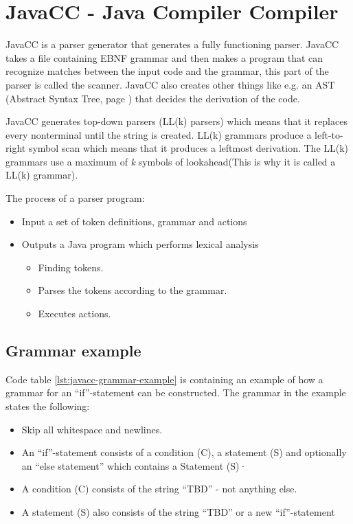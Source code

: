 \chapter{JavaCC - Java Compiler Compiler}
JavaCC is a parser generator that generates a fully functioning parser. JavaCC takes a file containing EBNF grammar and then makes a program that can recognize matches between the input code and the grammar, this part of the parser is called the scanner. JavaCC also creates other things like e.g. an AST (Abstract Syntax Tree, page ) that decides the derivation of the code. \cite{JavaCC}

JavaCC generates top-down parsers (LL(k) parsers) which means that it replaces every nonterminal until the string is created. LL(k) grammars produce a left-to-right symbol scan which means that it produces a leftmost derivation. The LL(k) grammars use a maximum of \textit{k} symbols of lookahead(This is why it is called a LL(k) grammar).\cite{javacc-wustl-ppt}

The process of a parser program:
\begin{itemize}
\item Input a set of token definitions, grammar and actions
\item Outputs a Java program which performs lexical analysis
	\begin{itemize}
	\item Finding tokens.
	\item Parses the tokens according to the grammar.
	\item Executes actions.
	\end{itemize}
\end{itemize}


\section{Grammar example}
Code table \ref{lst:javacc-grammar-example} is containing an example of how a grammar for an ``if''-statement can be constructed. The grammar in the example states the following:

\begin{itemize}
	\item Skip all whitespace and newlines.
	\item An ``if''-statement consists of a condition (C), a statement (S)  and optionally an ``else statement'' which contains a Statement (S)·
	\item A condition (C) consists of the string ``TBD'' - not anything else.
	\item A statement (S) also consists of the string ``TBD'' or a new ``if''-statement
\end{itemize}

